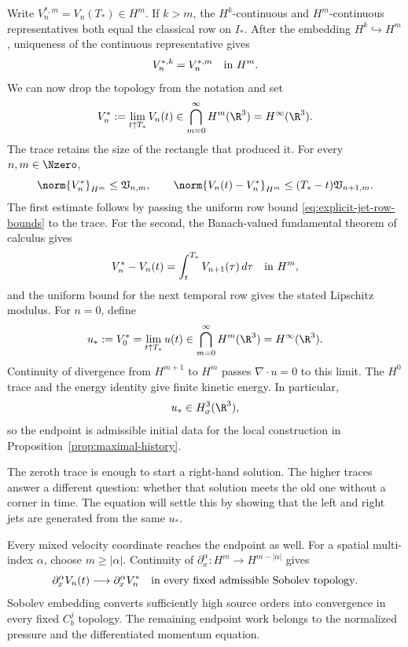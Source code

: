 Write \(V_n^{*,m}=V_n(T_*)\in H^m\).  If \(k>m\), the
\(H^k\)-continuous and \(H^m\)-continuous representatives both equal the
classical row on \(I_*\).  After the embedding \(H^k\hookrightarrow H^m\),
uniqueness of the continuous representative gives
\[
 V_n^{*,k}=V_n^{*,m}\quad\hbox{in }H^m.
\]
We can now drop the topology from the notation and set
\begin{equation}
 V_n^*:=\lim_{t\uparrow T_*}V_n(t)
 \in\bigcap_{m=0}^{\infty}H^m(\R^3)=H^\infty(\R^3).
 \label{eq:all-temporal-endpoints}
\end{equation}
The trace retains the size of the rectangle that produced it.  For every
\(n,m\in\Nzero\),
\begin{equation}
 \norm{V_n^*}_{H^m}
 \le\mathfrak V_{n,m},
 \qquad
 \norm{V_n(t)-V_n^*}_{H^m}
 \le(T_*-t)\mathfrak V_{n+1,m}.
 \label{eq:quantitative-endpoint-row}
\end{equation}
The first estimate follows by passing the uniform row bound
\eqref{eq:explicit-jet-row-bounds} to the trace.  For the second, the
Banach-valued fundamental theorem of calculus gives
\[
 V_n^*-V_n(t)=\int_t^{T_*}V_{n+1}(\tau)\,d\tau
 \quad\hbox{in }H^m,
\]
and the uniform bound for the next temporal row gives the stated Lipschitz
modulus.
For \(n=0\), define
\begin{equation}
 u_*:=V_0^*=\lim_{t\uparrow T_*}u(t)
 \in\bigcap_{m=0}^{\infty}H^m(\R^3)=H^\infty(\R^3).
 \label{eq:common-velocity-endpoint}
\end{equation}
Continuity of divergence from \(H^{m+1}\) to \(H^m\) passes
\(\nabla\cdot u=0\) to this limit.  The \(H^0\) trace and the energy identity
give finite kinetic energy.  In particular,
\[
 u_*\in H^3_\sigma(\R^3),
\]
so the endpoint is admissible initial data for the local construction in
Proposition~\ref{prop:maximal-history}.

The zeroth trace is enough to start a right-hand solution.  The higher traces
answer a different question: whether that solution meets the old one without
a corner in time.  The equation will settle this by showing that the left and
right jets are generated from the same \(u_*\).

Every mixed velocity coordinate reaches the endpoint as well.  For a spatial
multi-index \(\alpha\), choose \(m\ge|\alpha|\).  Continuity of
\(\partial_x^\alpha:H^m\to H^{m-|\alpha|}\) gives
\begin{equation*}
 \partial_x^\alpha V_n(t)
 \longrightarrow \partial_x^\alpha V_n^*
 \quad\hbox{in every fixed admissible Sobolev topology}.
\end{equation*}
Sobolev embedding converts sufficiently high source orders into convergence
in every fixed \(C_b^j\) topology.  The remaining endpoint work belongs to the
normalized pressure and the differentiated momentum equation.

